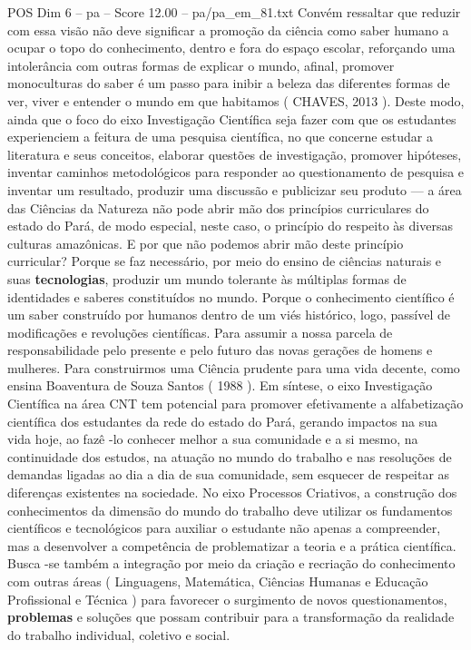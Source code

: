 \begin{textsample}{POS Dim 6 – pa – Score 12.00 – pa/pa\_em\_81.txt}
Convém ressaltar que reduzir com essa visão não deve significar a promoção da ciência como saber humano a ocupar o topo do conhecimento, dentro e fora do espaço escolar, reforçando uma intolerância com outras formas de explicar o mundo, afinal, promover monoculturas do saber é um passo para inibir a beleza das diferentes formas de ver, viver e entender o mundo em que habitamos ( CHAVES, 2013 ).
Deste modo, ainda que o foco do eixo Investigação Científica seja fazer com que os estudantes experienciem a feitura de uma pesquisa científica, no que concerne estudar a literatura e seus conceitos, elaborar questões de investigação, promover hipóteses, inventar caminhos metodológicos para responder ao questionamento de pesquisa e inventar um resultado, produzir uma discussão e publicizar seu produto — a área das Ciências da Natureza não pode abrir mão dos princípios curriculares do estado do Pará, de modo especial, neste caso, o princípio do respeito às diversas culturas amazônicas.
E por que não podemos abrir mão deste princípio curricular?
Porque se faz necessário, por meio do ensino de ciências naturais e suas \textbf{tecnologias}, produzir um mundo tolerante às múltiplas formas de identidades e saberes constituídos no mundo.
Porque o conhecimento científico é um saber construído por humanos dentro de um viés histórico, logo, passível de modificações e revoluções científicas.
Para assumir a nossa parcela de responsabilidade pelo presente e pelo futuro das novas gerações de homens e mulheres.
Para construirmos uma Ciência prudente para uma vida decente, como ensina Boaventura de Souza Santos ( 1988 ).
Em síntese, o eixo Investigação Científica na área CNT tem potencial para promover efetivamente a alfabetização científica dos estudantes da rede do estado do Pará, gerando impactos na sua vida hoje, ao fazê -lo conhecer melhor a sua comunidade e a si mesmo, na continuidade dos estudos, na atuação no mundo do trabalho e nas resoluções de demandas ligadas ao dia a dia de sua comunidade, sem esquecer de respeitar as diferenças existentes na sociedade.
No eixo Processos Criativos, a construção dos conhecimentos da dimensão do mundo do trabalho deve utilizar os fundamentos científicos e tecnológicos para auxiliar o estudante não apenas a compreender, mas a desenvolver a competência de problematizar a teoria e a prática científica.
Busca -se também a integração por meio da criação e recriação do conhecimento com outras áreas ( Linguagens, Matemática, Ciências Humanas e Educação Profissional e Técnica ) para favorecer o surgimento de novos questionamentos, \textbf{problemas} e soluções que possam contribuir para a transformação da realidade do trabalho individual, coletivo e social.

\end{textsample}
